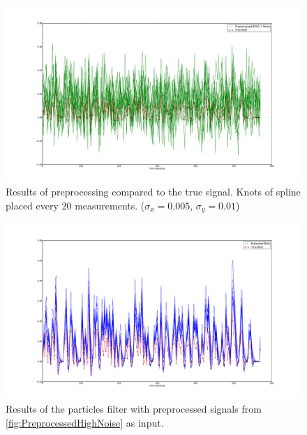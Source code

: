 \begin{figure}
\includegraphics[clip=true,trim=6cm 2cm 5cm 3.5cm,width=15cm]{images/preprocessed_highnoise}
\caption[Results of preprocessing compared to the true signal.]
{Results of preprocessing compared to the true signal.  
 Knots of spline placed every 20 measurements. ($\sigma_x = 0.005$, $\sigma_y = 0.01$)}
\label{fig:PreprocessedHighNoise}
\end{figure}

\begin{figure}
\includegraphics[clip=true,trim=6cm 2cm 5cm 3.5cm,width=15cm]{images/comparison_highnoise}
\caption{Results of the particles filter with preprocessed signals from \autoref{fig:PreprocessedHighNoise}
as input.}
\label{fig:FitComparisonHighNoise}
\end{figure}

